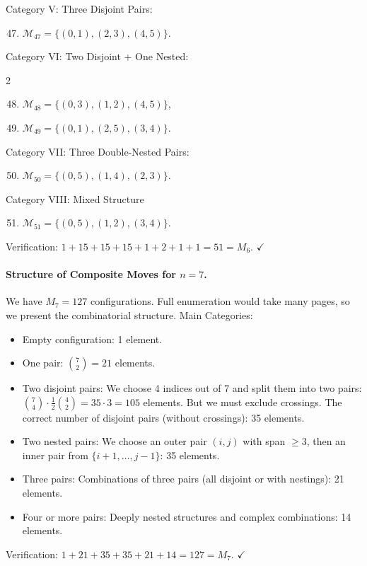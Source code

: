 \documentclass[runningheads]{llncs}
\begin{document}
Category V: Three Disjoint Pairs:
\begin{enumerate}
  \setcounter{enumi}{46}
  \item $\mathcal{M}_{47} = \{(0,1), (2,3), (4,5)\}$.
\end{enumerate}
Category VI: Two Disjoint + One Nested:
\begin{multicols}{2}
\begin{enumerate}
  \setcounter{enumi}{47}
  \item $\mathcal{M}_{48} = \{(0,3), (1,2), (4,5)\}$,
  \item $\mathcal{M}_{49} = \{(0,1), (2,5), (3,4)\}$.
\end{enumerate}
\end{multicols}
Category VII: Three Double-Nested Pairs:
\begin{enumerate}
  \setcounter{enumi}{49}
  \item $\mathcal{M}_{50} = \{(0,5), (1,4), (2,3)\}$.
\end{enumerate}
Category VIII: Mixed Structure
\begin{enumerate}
  \setcounter{enumi}{50}
  \item $\mathcal{M}_{51} = \{(0,5), (1,2), (3,4)\}$.
\end{enumerate}
Verification: $1 + 15 + 15 + 15 + 1 + 2 + 1 + 1 = 51 = M_6$. \quad $\checkmark$

\paragraph{Structure of Composite Moves for $n=7$.} We have $M_7 = 127$ configurations. Full enumeration would take many pages, so we present the combinatorial structure.
Main Categories:
\begin{itemize}
    \item Empty configuration: 1 element.
    \item One pair: $\binom{7}{2} = 21$ elements.
    \item Two disjoint pairs: We choose 4 indices out of 7 and split them into two pairs: $\binom{7}{4} \cdot \frac{1}{2}\binom{4}{2} = 35 \cdot 3 = 105$ elements. But we must exclude crossings. The correct number of disjoint pairs (without crossings): 35 elements.
    \item Two nested pairs: We choose an outer pair $(i,j)$ with span $\ge 3$, then an inner pair from $\{i+1, \ldots, j-1\}$: 35 elements.
    \item Three pairs: Combinations of three pairs (all disjoint or with nestings): 21 elements.
    \item Four or more pairs: Deeply nested structures and complex combinations: 14 elements.
\end{itemize}
Verification: $1 + 21 + 35 + 35 + 21 + 14 = 127 = M_7$. \quad $\checkmark$
\end{document}
